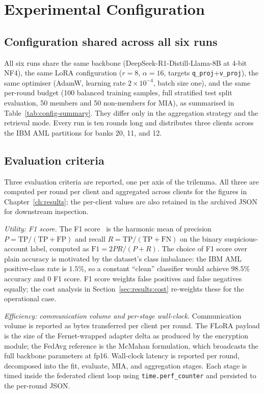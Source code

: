 \documentclass{report}
\begin{document}
\section{Experimental Configuration}
\label{sec:meth:config}

\subsection{Configuration shared across all six runs}

All six runs share the same backbone (DeepSeek-R1-Distill-Llama-8B at 4-bit NF4), the same LoRA configuration ($r=8$, $\alpha=16$, targets \texttt{q\_proj}+\texttt{v\_proj}), the same optimiser (AdamW, learning rate $2 \times 10^{-4}$, batch size one), and the same per-round budget (100 balanced training samples, full stratified test split evaluation, 50 members and 50 non-members for MIA), as summarised in Table~\ref{tab:config-summary}. They differ only in the aggregation strategy and the retrieval mode. Every run is ten rounds long and distributes three clients across the IBM AML partitions for banks 20, 11, and 12.



\subsection{Evaluation criteria}
\label{sec:meth:eval-criteria}

Three evaluation criteria are reported, one per axis of the trilemma. All three are computed per round per client and aggregated across clients for the figures in Chapter~\ref{ch:results}; the per-client values are also retained in the archived JSON for downstream inspection.

\textit{Utility: F1 score.} The F1 score~\cite{10.3115/1072064.1072067} is the harmonic mean of precision $P = \mathrm{TP}/(\mathrm{TP}+\mathrm{FP})$ and recall $R = \mathrm{TP}/(\mathrm{TP}+\mathrm{FN})$ on the binary suspicious-account label, computed as $\mathrm{F1} = 2PR/(P+R)$. The choice of F1 score over plain accuracy is motivated by the dataset's class imbalance: the IBM AML positive-class rate is $1.5\%$, so a constant ``clean'' classifier would achieve $98.5\%$ accuracy and $0$ F1 score. F1 score weights false positives and false negatives equally; the cost analysis in Section~\ref{sec:results:cost} re-weights these for the operational case.

\textit{Efficiency: communication volume and per-stage wall-clock.} Communication volume is reported as bytes transferred per client per round. The FLoRA payload is the size of the Fernet-wrapped adapter delta as produced by the encryption module; the FedAvg reference is the McMahan formulation, which broadcasts the full backbone parameters at fp16. Wall-clock latency is reported per round, decomposed into the fit, evaluate, MIA, and aggregation stages. Each stage is timed inside the federated client loop using \texttt{time.perf\_counter} and persisted to the per-round JSON.
\end{document}
